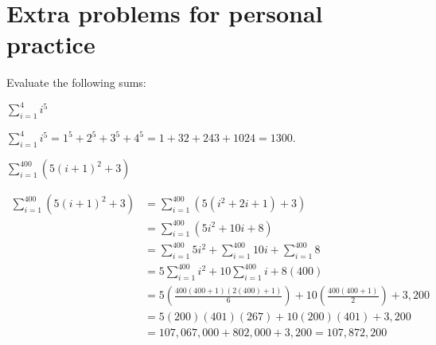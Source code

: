 \documentclass[nooutcomes]{ximera}
\renewenvironment{freeResponse}{
\ifhandout\setbox0\vbox\bgroup\else
\begin{trivlist}\item[\hskip \labelsep\bfseries Solution:\hspace{2ex}]
\fi}
{\ifhandout\egroup\else
\end{trivlist}
\fi}
\begin{document}
\section{Extra problems for personal practice}    
\begin{problem}
  Evaluate the following sums:
  \begin{enumerate}
  \item $\sum_{i=1}^{4} i^5 $
    \begin{freeResponse}
      $\sum_{i=1}^{4} i^5 = 1^5 + 2^5 + 3^5 + 4^5 = 1 + 32 + 243 +
      1024 = 1300$.
    \end{freeResponse}

  \item $\sum_{i=1}^{400} (5(i+1)^2 + 3) $
    \begin{freeResponse}
      \begin{align*}
        \sum_{i=1}^{400} (5(i+1)^2 + 3) 
        &= \sum_{i=1}^{400} (5(i^2 + 2i + 1) + 3) \\
        &= \sum_{i=1}^{400} (5i^2 + 10i + 8) \\
        &= \sum_{i=1}^{400} 5i^2 + \sum_{i=1}^{400} 10i + \sum_{i=1}^{400} 8  \\
        &= 5\sum_{i=1}^{400} i^2 + 10 \sum_{i=1}^{400} i + 8(400)  \\
        &= 5 \left( \frac{400(400+1)(2(400) + 1)}{6} \right) + 10 \left( \frac{400(400+1)}{2} \right) + 3,200  \\
        &= 5 (200)(401)(267) + 10(200)(401) + 3,200  \\
        &= 107,067,000 + 802,000 + 3,200 = 107,872,200
      \end{align*}
    \end{freeResponse}
  \end{enumerate}
\end{problem}
\end{document}
